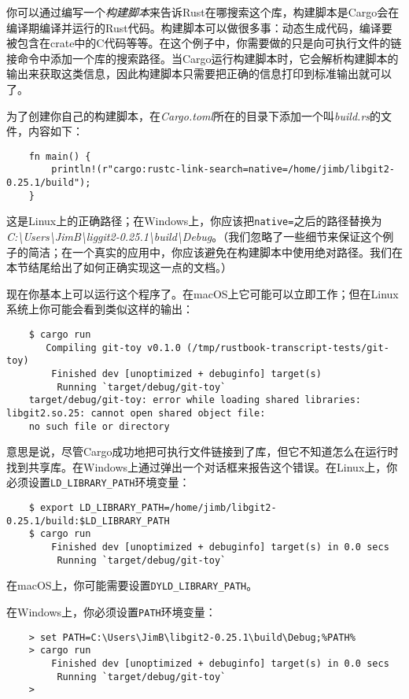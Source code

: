 你可以通过编写一个\emph{构建脚本}来告诉Rust在哪搜索这个库，构建脚本是Cargo会在编译期编译并运行的Rust代码。构建脚本可以做很多事：动态生成代码，编译要被包含在crate中的C代码等等。在这个例子中，你需要做的只是向可执行文件的链接命令中添加一个库的搜索路径。当Cargo运行构建脚本时，它会解析构建脚本的输出来获取这类信息，因此构建脚本只需要把正确的信息打印到标准输出就可以了。

为了创建你自己的构建脚本，在\emph{Cargo.toml}所在的目录下添加一个叫\emph{build.rs}的文件，内容如下：
\begin{verbatim}
    fn main() {
        println!(r"cargo:rustc-link-search=native=/home/jimb/libgit2-0.25.1/build");
    }
\end{verbatim}

这是Linux上的正确路径；在Windows上，你应该把\texttt{native=}之后的路径替换为\\
\emph{C:\textbackslash{}Users\textbackslash{}JimB\textbackslash{}liggit2-0.25.1\textbackslash{}build\textbackslash{}Debug}。（我们忽略了一些细节来保证这个例子的简洁；在一个真实的应用中，你应该避免在构建脚本中使用绝对路径。我们在本节结尾给出了如何正确实现这一点的文档。）

现在你基本上可以运行这个程序了。在macOS上它可能可以立即工作；但在Linux系统上你可能会看到类似这样的输出：
\begin{verbatim}
    $ cargo run
       Compiling git-toy v0.1.0 (/tmp/rustbook-transcript-tests/git-toy)
        Finished dev [unoptimized + debuginfo] target(s)
         Running `target/debug/git-toy`
    target/debug/git-toy: error while loading shared libraries: libgit2.so.25: cannot open shared object file:
    no such file or directory
\end{verbatim}

意思是说，尽管Cargo成功地把可执行文件链接到了库，但它不知道怎么在运行时找到共享库。在Windows上通过弹出一个对话框来报告这个错误。在Linux上，你必须设置\texttt{LD\_LIBRARY\_PATH}环境变量：
\begin{verbatim}
    $ export LD_LIBRARY_PATH=/home/jimb/libgit2-0.25.1/build:$LD_LIBRARY_PATH
    $ cargo run
        Finished dev [unoptimized + debuginfo] target(s) in 0.0 secs
         Running `target/debug/git-toy`
\end{verbatim}

在macOS上，你可能需要设置\texttt{DYLD\_LIBRARY\_PATH}。

在Windows上，你必须设置\texttt{PATH}环境变量：
\begin{verbatim}
    > set PATH=C:\Users\JimB\libgit2-0.25.1\build\Debug;%PATH%
    > cargo run
        Finished dev [unoptimized + debuginfo] target(s) in 0.0 secs
         Running `target/debug/git-toy`
    >
\end{verbatim}

